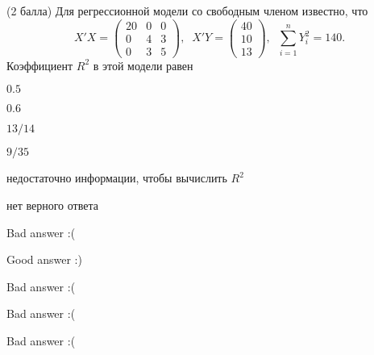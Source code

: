 
\begin{question}
(2 балла) Для регрессионной модели со свободным членом известно, что \[
X'X = \begin{pmatrix}
20 & 0 & 0 \\
0 & 4 & 3 \\
0 & 3 & 5
\end{pmatrix}, \; \;
X'Y = \begin{pmatrix}
40 \\
10 \\
13
\end{pmatrix}, \;\;
\sum_{i=1}^n Y_i^2 = 140.
\] Коэффициент \(R^2\) в этой модели равен
\begin{answerlist}
  \item \(0.5\)
  \item \(0.6\)
  \item \(13/14\)
  \item \(9/35\)
  \item недостаточно информации, чтобы вычислить \(R^2\)
  \item нет верного ответа
\end{answerlist}
\end{question}

\begin{solution}
\begin{answerlist}
  \item Bad answer :(
  \item Good answer :)
  \item Bad answer :(
  \item Bad answer :(
  \item Bad answer :(
\end{answerlist}
\end{solution}
